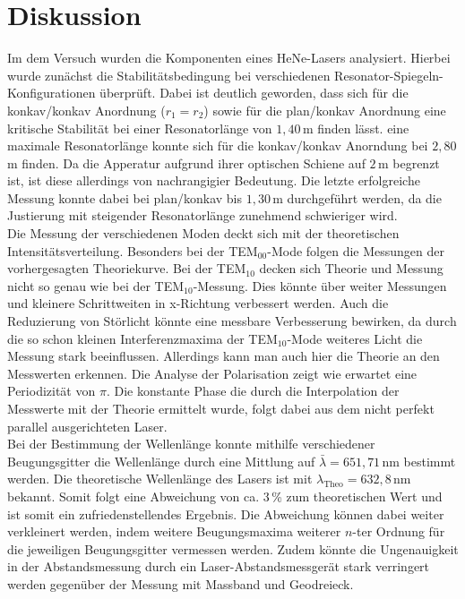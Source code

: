 \newpage
\section{Diskussion}
Im dem Versuch wurden die Komponenten eines HeNe-Lasers analysiert. Hierbei wurde zunächst die
Stabilitätsbedingung bei verschiedenen Resonator-Spiegeln-Konfigurationen überprüft. 
Dabei ist deutlich geworden, dass sich für die konkav/konkav Anordnung ($r_1=r_2$) sowie für
die plan/konkav Anordnung eine kritische Stabilität bei einer Resonatorlänge von $1,40\,$m finden lässt.
eine maximale Resonatorlänge konnte sich für die konkav/konkav Anorndung bei $2,80\,$m finden.
Da die Apperatur aufgrund ihrer optischen Schiene auf $2\,$m begrenzt ist, ist diese allerdings von nachrangigier Bedeutung.
Die letzte erfolgreiche Messung konnte dabei bei plan/konkav bis $1,30\,$m durchgeführt werden, da die Justierung mit
steigender Resonatorlänge zunehmend schwieriger wird.\\
Die Messung der verschiedenen Moden deckt sich mit der theoretischen Intensitätsverteilung.
Besonders bei der TEM$_{00}$-Mode folgen die Messungen der vorhergesagten Theoriekurve. Bei der TEM$_{10}$ decken sich Theorie und Messung 
nicht so genau wie bei der TEM$_{10}$-Messung. Dies könnte über weiter Messungen und kleinere Schrittweiten in x-Richtung verbessert werden.
Auch die Reduzierung von Störlicht könnte eine messbare Verbesserung bewirken, da durch die so schon kleinen Interferenzmaxima der TEM$_{10}$-Mode
weiteres Licht die Messung stark beeinflussen.
Allerdings kann man auch hier die Theorie an den Messwerten erkennen.
Die Analyse der Polarisation zeigt wie erwartet eine Periodizität von $\pi$. Die konstante Phase die
durch die Interpolation der Messwerte mit der Theorie ermittelt wurde, folgt dabei aus dem nicht perfekt
parallel ausgerichteten Laser.\\
Bei der Bestimmung der Wellenlänge konnte mithilfe verschiedener Beugungsgitter die Wellenlänge durch eine Mittlung auf
$\bar{\lambda}=651,71\,$nm bestimmt werden. Die theoretische Wellenlänge des Lasers ist mit $\lambda_{\text{Theo}}=632,8\,$nm bekannt.
Somit folgt eine Abweichung von ca. $3\,$\% zum theoretischen Wert und ist somit ein zufriedenstellendes Ergebnis.
Die Abweichung können dabei weiter verkleinert werden, indem weitere Beugungsmaxima weiterer $n$-ter Ordnung für die jeweiligen Beugungsgitter
vermessen werden. Zudem könnte die Ungenauigkeit in der Abstandsmessung durch ein Laser-Abstandsmessgerät stark verringert werden gegenüber der Messung mit Massband und Geodreieck.
\label{sec:Diskussion}
